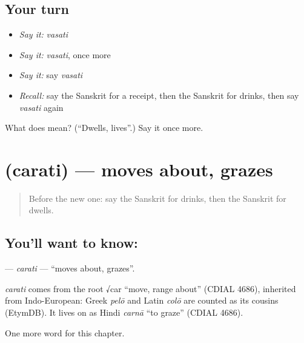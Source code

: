\subsection*{Your turn}
\begin{itemize}
\raggedright
  \item \emph{Say it:} \emph{vasati}
  \item \emph{Say it:} \emph{vasati}, once more
  \item \emph{Say it:} say \emph{vasati}
  \item \emph{Recall:} say the Sanskrit for a receipt, then the Sanskrit for drinks, then say \emph{vasati} again
\end{itemize}

\begin{tcolorbox}[breakable,colback=teal!4,colframe=teal!35!black,title={Before you move on}]
What does  mean? (\textquotedblleft{}Dwells, lives\textquotedblright{}.) Say it once more.
\end{tcolorbox}
\section[\texorpdfstring{\sk{चरति} (carati)}{चरति (carati)}]{ (carati) — moves about, grazes}

\label{lesson:SA-C141-carati}



\begin{quote}
Before the new one: say the Sanskrit for drinks, then the Sanskrit for dwells.
\end{quote}

\subsection*{You'll want to know: }
\textbf{} — \emph{carati} — \textquotedblleft{}moves about, grazes\textquotedblright{}.

\begin{cousinweb}
\emph{carati} comes from the root √car \textquotedblleft{}move, range about\textquotedblright{} (CDIAL 4686), inherited from Indo-European: Greek \emph{pelō} and Latin \emph{colō} are counted as its cousins (EtymDB). It lives on as Hindi \emph{carnā} \textquotedblleft{}to graze\textquotedblright{} (CDIAL 4686).
\end{cousinweb}

\begin{grammarlens}[title={What you've built}]
One more word for this chapter.
\end{grammarlens}

